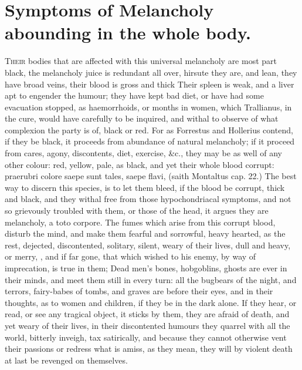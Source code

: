 {%
\section[Symptoms In the Whole Body]{Symptoms of Melancholy abounding in the whole body.}

\lettrine{T}{heir} bodies that are affected with this universal melancholy are most
part black, the melancholy juice is redundant all over, hirsute
they are, and lean, they have broad veins, their blood is gross and
thick  Their spleen is weak, and a liver apt to engender the
humour; they have kept bad diet, or have had some evacuation stopped,
as haemorrhoids, or months in women, which Trallianus, in the
cure, would have carefully to be inquired, and withal to observe of
what complexion the party is of, black or red. For as Forrestus and
Hollerius contend, if they be black, it proceeds from abundance
of natural melancholy; if it proceed from cares, agony, discontents,
diet, exercise, \&c., they may be as well of any other colour: red,
yellow, pale, as black, and yet their whole blood corrupt: praerubri
colore saepe sunt tales, saepe flavi, (saith  Montaltus cap. 22.)
The best way to discern this species, is to let them bleed, if the
blood be corrupt, thick and black, and they withal free from those
hypochondriacal symptoms, and not so grievously troubled with them, or
those of the head, it argues they are melancholy, a toto corpore. The
fumes which arise from this corrupt blood, disturb the mind, and make
them fearful and sorrowful, heavy hearted, as the rest, dejected,
discontented, solitary, silent, weary of their lives, dull and heavy,
or merry, \etc{}, and if far gone, that which \Apuleius wished to his
enemy, by way of imprecation, is true in them; Dead men's bones,
hobgoblins, ghosts are ever in their minds, and meet them still in
every turn: all the bugbears of the night, and terrors, fairy-babes of
tombs, and graves are before their eyes, and in their thoughts, as to
women and children, if they be in the dark alone. If they hear, or
read, or see any tragical object, it sticks by them, they are afraid of
death, and yet weary of their lives, in their discontented humours they
quarrel with all the world, bitterly inveigh, tax satirically, and
because they cannot otherwise vent their passions or redress what is
amiss, as they mean, they will by violent death at last be revenged on
themselves.

}
